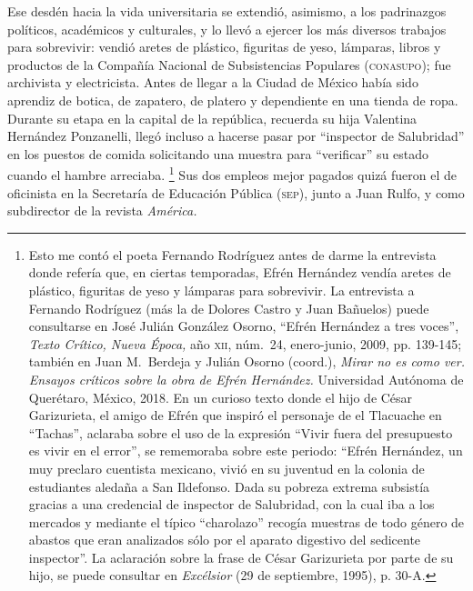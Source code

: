 \documentclass[14pt,twoside,final]{extbook} %
\let\oldfootnote\footnote
\renewcommand\footnote[1]{%
\oldfootnote{\hspace{1mm}#1}}
\begin{document}
Ese desdén hacia la vida universitaria se extendió, asimismo, a los padrinazgos políticos, académicos y culturales, y lo llevó a ejercer los más diversos trabajos para sobrevivir: vendió aretes de plástico, figuritas de yeso, lámparas, libros y productos de la Compañía Nacional de Subsistencias Populares (\textsc{conasupo}); fue archivista y electricista. Antes de llegar a la Ciudad de México había sido aprendiz de botica, de zapatero, de platero y dependiente en una tienda de ropa. Durante su etapa en la capital de la república, recuerda su hija Valentina Hernández Ponzanelli, llegó incluso a hacerse pasar por ``inspector de Salubridad'' en los puestos de comida solicitando una muestra para ``verificar'' su estado cuando el hambre arreciaba.\footnote{Esto me contó el poeta Fernando Rodríguez antes de darme la entrevista donde refería que, en ciertas temporadas, Efrén Hernández vendía aretes de plástico, figuritas de yeso y lámparas para sobrevivir. La entrevista a Fernando Rodríguez (más la de Dolores Castro y Juan Bañuelos) puede consultarse en José Julián González Osorno, ``Efrén Hernández a tres voces'', \emph{Texto Crítico, Nueva Época,} año \textsc{xii}, núm.~24, enero-junio, 2009, pp. 139-145; también en Juan M.~Berdeja y Julián Osorno (coord.), \emph{Mirar no es como ver. Ensayos críticos sobre la obra de Efrén Hernández.} Universidad Autónoma de Querétaro, México, 2018. En un curioso texto donde el hijo de César Garizurieta, el amigo de Efrén que inspiró el personaje de el Tlacuache en ``Tachas'', aclaraba sobre el uso de la expresión ``Vivir fuera del presupuesto es vivir en el error'', se rememoraba sobre este periodo: ``Efrén Hernández, un muy preclaro cuentista mexicano, vivió en su juventud en la colonia de estudiantes aledaña a San Ildefonso. Dada su pobreza extrema subsistía gracias a una credencial de inspector de Salubridad, con la cual iba a los mercados y mediante el típico ``charolazo'' recogía muestras de todo género de abastos que eran analizados sólo por el aparato digestivo del sedicente inspector''. La aclaración sobre la frase de César Garizurieta por parte de su hijo, se puede consultar en \emph{Excélsior} (29 de septiembre, 1995), p. 30-A.} Sus dos empleos mejor pagados quizá fueron el de oficinista en la Secretaría de Educación Pública (\textsc{sep}), junto a Juan Rulfo, y como subdirector de la revista \emph{América.}
\end{document}
